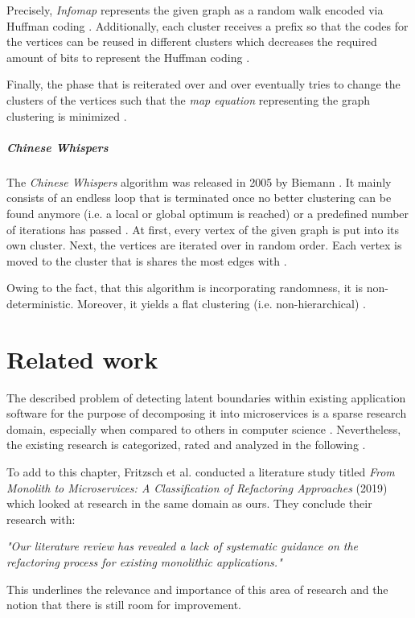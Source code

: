 \documentclass[12pt,a4paper]{report}
\begin{document}
Precisely, \textit{Infomap} represents the given graph as a random walk encoded
via Huffman coding \cite{huffman1952coding}.
Additionally, each cluster receives a prefix so that the codes for the vertices
can be reused in different clusters which decreases the required amount of bits
to represent the Huffman coding \cite{rosvall2008infomap}.


Finally, the phase that is reiterated over and over eventually tries to
change the clusters of the vertices such that the \textit{map equation}
representing the graph clustering is minimized \cite{rosvall2008infomap}.

\paragraph{Chinese Whispers \cite{biemann2006chinese}}
The \textit{Chinese Whispers} algorithm was released in 2005 by Biemann
\cite{biemann2006chinese}.
It mainly consists of an endless loop that is terminated once no better
clustering can be found anymore (i.e. a local or global optimum is reached)
or a predefined number of iterations has passed \cite{biemann2006chinese}.
At first, every vertex of the given graph is put into its own cluster.
Next, the vertices are iterated over in random order. Each vertex is moved
to the cluster that is shares the most edges with \cite{biemann2006chinese}.

Owing to the fact, that this algorithm is incorporating randomness,
it is non\hyp deterministic. Moreover, it yields a flat clustering
(i.e. non\hyp hierarchical) \cite{biemann2006chinese}.




\chapter{Related work} \label{chap:related}

The described problem of detecting latent boundaries within existing
application software for the purpose of decomposing it into microservices is
a sparse research domain, especially when compared to others
in computer science \cite{fritzsch2018monolith}.
Nevertheless, the existing research is categorized, rated and analyzed in the
following \textit{}.

To add to this chapter, Fritzsch et al. conducted a literature study titled
\textit{From Monolith to Microservices: A Classification of Refactoring Approaches} (2019)
\cite{fritzsch2018monolith} which looked at research in the same domain as ours.
They conclude their research with:
\begin{displayquote}
\emph{"Our literature review has revealed a lack of systematic guidance on the
refactoring process for existing monolithic applications."}~\cite{fritzsch2018monolith}
\end{displayquote}
This underlines the relevance and importance of this area of research and the
notion that there is still room for improvement.
\newpage
\end{document}
